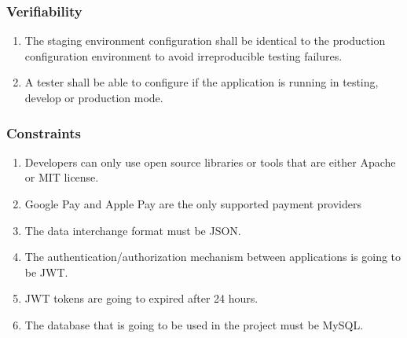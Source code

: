 \subsubsection{Verifiability}
\begin{enumerate}[label=VER-\arabic*]
    \item The staging environment configuration shall be identical to the 
    production configuration environment to avoid irreproducible 
    testing failures.
    \item A tester shall be able to configure if the application is 
    running in testing, develop or production mode.
\end{enumerate}
\pagebreak
\subsubsection{Constraints}
\begin{enumerate}[label=CON-\arabic*]
    \item Developers can only use open source libraries or tools that are 
    either Apache or MIT license.
    \item Google Pay and Apple Pay are the only supported payment providers
    \item The data interchange format must be JSON.
    \item The authentication/authorization mechanism between applications 
    is going to be JWT.
    \item JWT tokens are going to expired after 24 hours.
    \item The database that is going to be used in the project must be MySQL.
\end{enumerate}